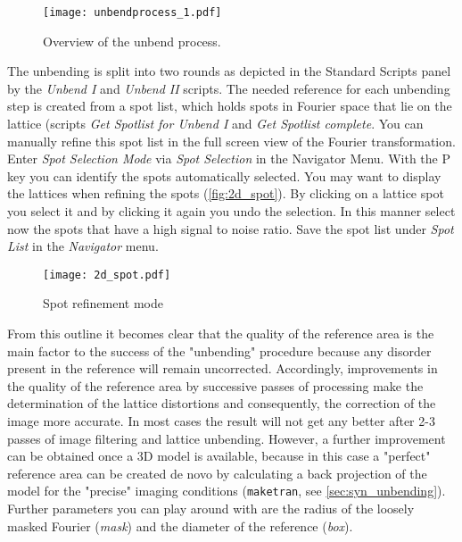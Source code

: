 \begin{figure}[H]
		\centering
		\texttt{[image: unbendprocess\_1.pdf]}
		\caption{Overview of the unbend process.}
		\label{fig:unbendprocess_1}
	\end{figure}



The unbending is split into two rounds as depicted in the Standard Scripts panel by the \textit{Unbend I} and \textit{Unbend II} scripts. The needed reference for each unbending step is created from a spot list, which holds spots in Fourier space that lie on the lattice (scripts \textit{Get Spotlist for Unbend I} and \textit{Get Spotlist complete}. You can manually refine this spot list in the full screen view of the Fourier transformation. Enter \textit{Spot Selection Mode} via \textit{Spot Selection} in the Navigator Menu. With the P key you can identify the spots automatically selected. You may want to display the lattices when refining the spots (\autoref{fig:2d_spot}). By clicking on a lattice spot you select it and by clicking it again you undo the selection. In this manner select now the spots that have a high signal to noise ratio.
Save the spot list under \textit{Spot List} in the \textit{Navigator} menu.
	
	\begin{figure}[H]
		\centering
		\texttt{[image: 2d\_spot.pdf]}
		\caption{Spot refinement mode}
		\label{fig:2d_spot}
	\end{figure}


From this outline it becomes clear that the quality of the reference area is the main factor to the success of the "unbending" procedure because any disorder present in the reference will remain uncorrected. Accordingly, improvements in the quality of the reference area by successive passes of processing make the determination of the lattice distortions and consequently, the correction of the image more accurate. In most cases the result will not get any better after 2-3 passes of image filtering and lattice unbending. However, a further improvement can be obtained once a 3D model is available, because in this case a "perfect" reference area can be created de novo by calculating a back projection of the model for the "precise" imaging conditions (\texttt{maketran}, see \autoref{sec:syn_unbending}). Further parameters you can play around with are the radius of the loosely masked Fourier (\textit{mask}) and the diameter of the reference (\textit{box}).

	
\newpage

